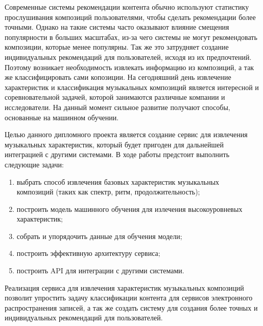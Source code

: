 Современные системы рекомендации контента обычно используют статистику прослушивания композиций пользователями, чтобы сделать рекомендации более точными. Однако на такие системы часто оказывают влияние смещения популярности в больших масштабах, из-за чего системы не могут рекомендовать композиции, которые менее популярны. Так же это затрудняет создание индивидуальных рекомендаций для пользователей, исходя из их предпочтений. Поэтому возникает необходимость извлекать информацию из композиций, а так же классифицировать сами копозиции. На сегодняшний день извлечение характеристик и классификация музыкальных композиций является интересной и соревновательной задачей, которой занимаются различные компании и исследователи. На данный момент сильное развитие получают способы, основанные на машинном обучении.


Целью данного дипломного проекта является создание сервис для извлечения музыкальных характеристик, который будет пригоден для дальнейшей интеграцией с другими системами. В ходе работы предстоит выполнить следующие задачи:
\begin{enumerate}
  \item выбрать способ извлечения базовых характеристик музыкальных \\ком\-по\-зи\-ций (таких как спектр, ритм, продолжительность);
  \item построить модель машинного обучения для излечения высокоуровневых характеристик;
  \item собрать и упорядочить данные для обучения модели;
  \item построить эффективную архитектуру сервиса;
  \item построить API для интеграции с другими системами.
\end{enumerate}

Реализация сервиса для извлечения характеристик музыкальных композиций позволит упростить задачу классификации контента для сервисов электронного распространения записей, а так же создать систему для создания более точных и индивидуальных рекомендаций для пользователей.

